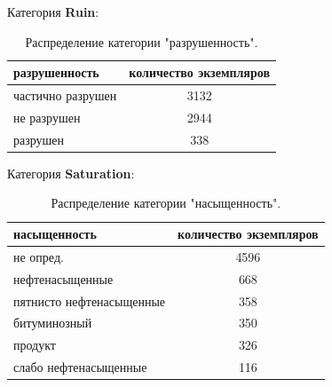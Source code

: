 \documentclass[14pt]{matmex-diploma}
\begin{document}
        Категория \textbf{Ruin}:
        
        \begin{table}[h!]
            \centering
            \begin{tabular}{|l|c|}
                \hline
                \textbf{разрушенность}            & \textbf{количество экземпляров} \\
                \hline
                частично разрушен &  3132 \\
                \hline
                не разрушен       &  2944 \\
                \hline
                разрушен          &   338 \\
                \hline
            \end{tabular}    
            \caption{Распределение категории "разрушенность".}
            \label{table_ruin}
        \end{table}
        
        \vskip 0.2in
        
        Категория \textbf{Saturation}:
        
        \begin{table}[h!]
            \centering
            \begin{tabular}{|l|c|}
                \hline
                \textbf{насыщенность}            & \textbf{количество экземпляров} \\
                \hline
                не опред.                &        4596 \\
                \hline
                нефтенасыщенные          &         668 \\
                \hline
                пятнисто нефтенасыщенные &         358 \\
                \hline
                битуминозный             &         350 \\
                \hline
                продукт                  &         326 \\
                \hline
                слабо нефтенасыщенные    &         116 \\
                \hline
            \end{tabular}    
            \caption{Распределение категории "насыщенность".}
            \label{table_saturation}  
        \end{table} 
    
    
 
\end{document}
